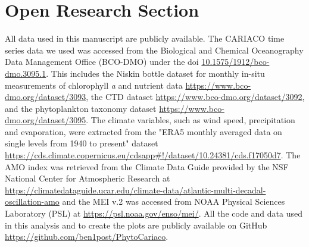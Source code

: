 \documentclass[draft]{agujournal2019}
\begin{document}
%








%
%

\section*{Open Research Section}
All data used in this manuscript are publicly available. The CARIACO time series data we used was accessed from the Biological and Chemical Oceanography Data Management Office (BCO-DMO) under the doi \url{10.1575/1912/bco-dmo.3095.1}. This includes the Niskin bottle dataset for monthly in-situ measurements of chlorophyll \textit{a} and nutrient data \url{https://www.bco-dmo.org/dataset/3093}, the CTD dataset \url{https://www.bco-dmo.org/dataset/3092}, and the phytoplankton taxonomy dataset \url{https://www.bco-dmo.org/dataset/3095}.
The climate variables, such as wind speed, precipitation and evaporation, were extracted from the "ERA5 monthly averaged data on single levels from 1940 to present" dataset \url{https://cds.climate.copernicus.eu/cdsapp#!/dataset/10.24381/cds.f17050d7}.
The AMO index was retrieved from the Climate Data Guide provided by the NSF National Center for Atmospheric Research at \url{https://climatedataguide.ucar.edu/climate-data/atlantic-multi-decadal-oscillation-amo} and the MEI v.2 was accessed from NOAA Physical Sciences Laboratory (PSL) at \url{https://psl.noaa.gov/enso/mei/}.
All the code and data used in this analysis and to create the plots are publicly available on GitHub \url{https://github.com/ben1post/PhytoCariaco}.
\end{document}
